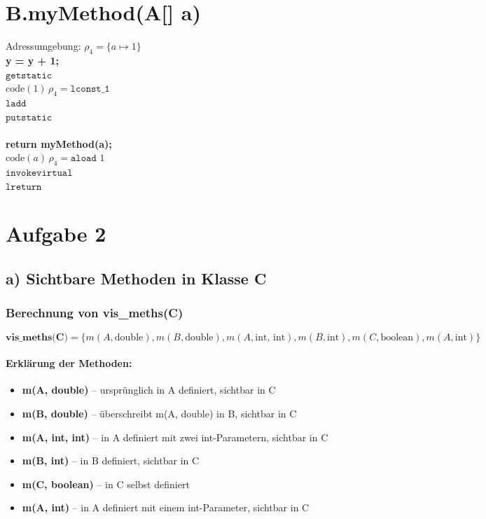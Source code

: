 \documentclass[11pt,a4paper]{article}
\begin{document}
\section*{B.myMethod(A[] a)}

Adressumgebung: $\rho_4 = \{a \mapsto 1\}$ \\
%
\textbf{y = y + 1;}\\
$\texttt{getstatic}$\\
$\text{code}(1) \, \rho_4 = \texttt{lconst\_1}$\\
$\texttt{ladd}$\\
$\texttt{putstatic}$\\\\
%
\textbf{return myMethod(a);}\\
$\text{code}(a) \, \rho_4 = \texttt{aload } 1$\\
$\texttt{invokevirtual}$\\
$\texttt{lreturn}$

\section{Aufgabe 2}

\subsection*{a) Sichtbare Methoden in Klasse C}

\subsubsection*{Berechnung von vis\_meths(C)}
\[
    \textbf{vis\_meths(C)} = \{m(A, \text{double}), m(B, \text{double}), m(A, \text{int, int}), m(B, \text{int}), m(C, \text{boolean}), m(A, \text{int})\}
\]

\paragraph{Erklärung der Methoden:}
\begin{itemize}
    \item \textbf{m(A, double)} -- ursprünglich in A definiert, sichtbar in C
    \item \textbf{m(B, double)} -- überschreibt m(A, double) in B, sichtbar in C
    \item \textbf{m(A, int, int)} -- in A definiert mit zwei int-Parametern, sichtbar in C
    \item \textbf{m(B, int)} -- in B definiert, sichtbar in C
    \item \textbf{m(C, boolean)} -- in C selbst definiert
    \item \textbf{m(A, int)} -- in A definiert mit einem int-Parameter, sichtbar in C
\end{itemize}
\end{document}
